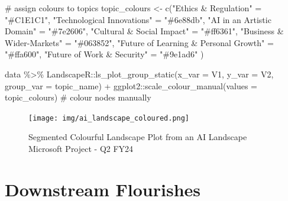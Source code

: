 \documentclass[
  letterpaper,
  DIV=11,
  numbers=noendperiod]{scrreprt}
\newenvironment{Shaded}{\begin{snugshade}}{\end{snugshade}}
\newcommand{\AttributeTok}[1]{\textcolor[rgb]{0.40,0.45,0.13}{#1}}
\newcommand{\CommentTok}[1]{\textcolor[rgb]{0.37,0.37,0.37}{#1}}
\newcommand{\FunctionTok}[1]{\textcolor[rgb]{0.28,0.35,0.67}{#1}}
\newcommand{\NormalTok}[1]{\textcolor[rgb]{0.00,0.23,0.31}{#1}}
\newcommand{\OtherTok}[1]{\textcolor[rgb]{0.00,0.23,0.31}{#1}}
\newcommand{\SpecialCharTok}[1]{\textcolor[rgb]{0.37,0.37,0.37}{#1}}
\newcommand{\StringTok}[1]{\textcolor[rgb]{0.13,0.47,0.30}{#1}}
\begin{document}
\begin{Shaded}
\begin{Highlighting}[]
\CommentTok{\# assign colours to topics}
\NormalTok{topic\_colours }\OtherTok{\textless{}{-}} \FunctionTok{c}\NormalTok{(}\StringTok{"Ethics \& Regulation"} \OtherTok{=} \StringTok{"\#C1E1C1"}\NormalTok{,}
                   \StringTok{"Technological Innovations"} \OtherTok{=} \StringTok{"\#6e88db"}\NormalTok{, }
                   \StringTok{"AI in an Artistic Domain"} \OtherTok{=} \StringTok{"\#7e2606"}\NormalTok{,}
                   \StringTok{"Cultural \& Social Impact"} \OtherTok{=} \StringTok{"\#ff6361"}\NormalTok{,}
                   \StringTok{"Business \& Wider{-}Markets"} \OtherTok{=} \StringTok{"\#063852"}\NormalTok{,}
                   \StringTok{"Future of Learning \& Personal Growth"} \OtherTok{=} \StringTok{"\#ffa600"}\NormalTok{,}
                   \StringTok{"Future of Work \& Security"} \OtherTok{=} \StringTok{"\#9e1ad6"}
\NormalTok{                   )}
\end{Highlighting}
\end{Shaded}

\begin{Shaded}
\begin{Highlighting}[]
\NormalTok{data }\SpecialCharTok{\%\textgreater{}\%} 
\NormalTok{  LandscapeR}\SpecialCharTok{::}\FunctionTok{ls\_plot\_group\_static}\NormalTok{(}\AttributeTok{x\_var =}\NormalTok{ V1,}
                                   \AttributeTok{y\_var =}\NormalTok{ V2,}
                                   \AttributeTok{group\_var =}\NormalTok{ topic\_name) }\SpecialCharTok{+}
\NormalTok{  ggplot2}\SpecialCharTok{::}\FunctionTok{scale\_colour\_manual}\NormalTok{(}\AttributeTok{values =}\NormalTok{ topic\_colours) }\CommentTok{\# colour nodes manually}
\end{Highlighting}
\end{Shaded}

\begin{figure}[H]

{\centering \texttt{[image: img/ai\_landscape\_coloured.png]}

}

\caption{Segmented Colourful Landscape Plot from an AI Landscape
Microsoft Project - Q2 FY24}

\end{figure}%

\section{Downstream Flourishes}\label{downstream-flourishes}
\end{document}
